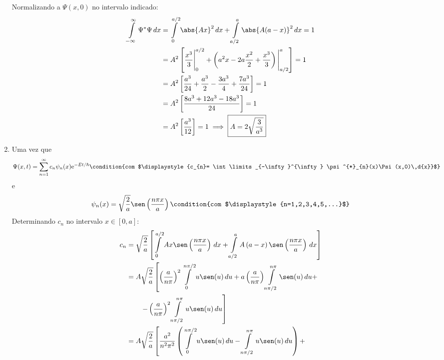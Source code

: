 \begin{prob}
\begin{sol}
\begin{enumerate}[label=\alph *)]
				Normalizando a $\Psi(x,0)$ no intervalo indicado: 
				\begin{align}
					\begin{split}
						\int\limits_{-\infty}^{\infty} \Psi^{*} \Psi\,d{x} &= \int\limits_{0}^{a/2}\abs{Ax}^{2}\,d{x}+\int\limits_{a/2}^{a}\abs{A(a-x)}^{2}\,d{x}=1\\
																															 &= A^{2}\left[\frac{x^{3}}{3}\Bigg|_{0}^{a/2}+\left(a^{2}x-2a \frac{x^{2}}{2}+\frac{x^{3}}{3}\right)\Bigg|_{a/2}^{a} \right]=1\\
																															 &= A^{2}\left[\frac{a^{3}}{24}+\frac{a^{3}}{2}-\frac{3a^{3}}{4}+\frac{7a^{3}}{24}\right]=1\\
																															 &= A^{2}\left[\frac{8a^{3}+12a^{3}-18a^{3}}{24}\right]=1\\
																															 &= A^{2}\left[\frac{a^{3}}{12}\right]=1\implies \boxed{ A=2\sqrt{\frac{3}{a^{3}}}}
					\end{split}
				\end{align}
			\item Uma vez que
				\begin{dmath*}
					\Psi(x,t) = \sum_{n=1}^{\infty}c_{n} \psi_{n}(x)\mathrm{e}^{-Et/\hbar}
					\condition{com $\displaystyle{c_{n}= \int\limits_{-\infty}^{\infty} \psi^{*}_{n}(x)\Psi(x,0)\,d{x}}$}
				\end{dmath*}
				e
				\begin{dmath*}
					\psi_{n}(x) = \sqrt{\frac{2}{a}}\sen \left(\frac{n \pi x}{a}\right)\condition{com $\displaystyle{n=1,2,3,4,5,...}$}
				\end{dmath*}
				Determinando $c_{n}$ no intervalo $x\in[0,a]$:
				\begin{align}
					\begin{split}
						c_{n} &= \sqrt{\frac{2}{a}}\left[\int\limits_{0}^{a/2}Ax\sen \left(\frac{n \pi x}{a}\right)\,d{x}+\int\limits_{a/2}^{a}A \left(a-x\right)\sen \left(\frac{n \pi x}{a}\right)\,d{x}\right]\\
									&= A\sqrt{\frac{2}{a}}\left[\left(\frac{a}{n \pi}\right)^{2}\int\limits_{0}^{n \pi/2}u\sen(u)\,d{u}+a \left(\frac{a}{n \pi}\right) \int\limits_{n \pi/2}^{n \pi}\sen(u)\,d{u}+\right. \\ 
									& \left. \qquad- \left(\frac{a}{n \pi}\right)^{2}\int\limits_{n \pi/2}^{n \pi}u\sen(u)\,d{u}\right]\\
									&= A\sqrt{\frac{2}{a}}\left[\frac{a^{2}}{n^{2} \pi^{2}}\left(\int\limits_{0}^{n \pi/2}u\sen(u)\,d{u}-\int\limits_{n \pi/2}^{n \pi}u\sen(u)\,d{u}\right)+\right.\\

\end{split}
\end{align}
\end{enumerate}
\end{sol}
\end{prob}
